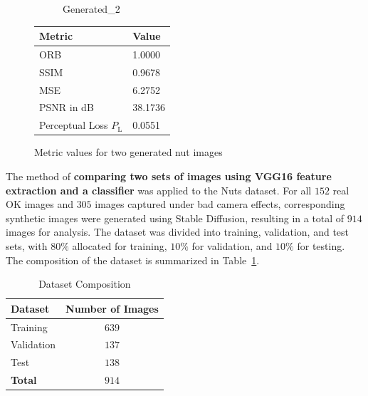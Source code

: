 \documentclass[12pt,DIV14,BCOR12mm,a4paper,footinclude=false,headinclude,parskip=half-,twoside,openright,cleardoublepage=empty,toc=index,bibliography=totoc,listof=totoc]{scrreprt}
\numberwithin{equation}{chapter}
\begin{document}
\begin{figure}
\begin{minipage}[H]{\linewidth}
\begin{minipage}[H]{0.5\linewidth}
\begin{subfigure}[t]{0.48\linewidth}
                \caption{Generated\_2}
            \end{subfigure}
        \end{minipage}%
        \hfill
        \begin{minipage}[H]{0.5\linewidth} %
            \centering
            \small
            \begin{tabular}{p{3cm} p{2cm}}
                \toprule
                \textbf{Metric} & \textbf{Value} \\
                \midrule
                ORB             & 1.0000        \\
                SSIM            & 0.9678        \\
                MSE             & 6.2752        \\
                PSNR in dB      & 38.1736       \\
                Perceptual Loss \( P_{\text{L}} \) & 0.0551        \\
                \bottomrule
            \end{tabular}
        \end{minipage}%
        \caption{Metric values for two generated nut images}
        \label{fig:comparison_metrics_two_generated_nut}
    \end{minipage}
\end{figure}

The method of \textbf{comparing two sets of images using VGG16 feature extraction and a classifier} was applied to the Nuts dataset. For all $152$ real OK images and $305$ images captured under bad camera effects, corresponding synthetic images were generated using Stable Diffusion, resulting in a total of $914$ images for analysis. The dataset was divided into training, validation, and test sets, with $80\%$ allocated for training, $10\%$ for validation, and $10\%$ for testing.  The composition of the dataset is summarized in Table~\ref{tab:dataset-composition}.

\begin{table} 
    \centering
    \caption{Dataset Composition}
    \label{tab:dataset-composition}
    \begin{tabular}{lc} %
        \toprule
        \textbf{Dataset} & \textbf{Number of Images} \\ 
        \midrule
        Training     & $639$ \\ 
        Validation   & $137$ \\ 
        Test         & $138$ \\ 
        \midrule
        \textbf{Total}   & $914$ \\ 
        \bottomrule
    \end{tabular}
\end{table}
\end{document}
